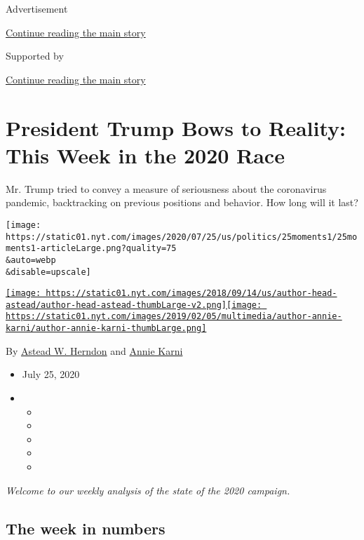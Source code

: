 Advertisement

\protect\hyperlink{after-top}{Continue reading the main story}

Supported by

\protect\hyperlink{after-sponsor}{Continue reading the main story}

\hypertarget{president-trump-bows-to-reality-this-week-in-the-2020-race}{%
\section{President Trump Bows to Reality: This Week in the 2020
Race}\label{president-trump-bows-to-reality-this-week-in-the-2020-race}}

Mr. Trump tried to convey a measure of seriousness about the coronavirus
pandemic, backtracking on previous positions and behavior. How long will
it last?

\texttt{[image: https://static01.nyt.com/images/2020/07/25/us/politics/25moments1/25moments1-articleLarge.png?quality=75\\\&auto=webp\\\&disable=upscale]}

\href{https://www.nytimes.com/by/astead-w-herndon}{\texttt{[image: https://static01.nyt.com/images/2018/09/14/us/author-head-astead/author-head-astead-thumbLarge-v2.png]}}\href{https://www.nytimes.com/by/annie-karni}{\texttt{[image: https://static01.nyt.com/images/2019/02/05/multimedia/author-annie-karni/author-annie-karni-thumbLarge.png]}}

By \href{https://www.nytimes.com/by/astead-w-herndon}{Astead W. Herndon}
and \href{https://www.nytimes.com/by/annie-karni}{Annie Karni}

\begin{itemize}
\item
  July 25, 2020
\item
  \begin{itemize}
  \item
  \item
  \item
  \item
  \item
  \end{itemize}
\end{itemize}

\emph{Welcome to our weekly analysis of the state of the 2020 campaign.}

\hypertarget{the-week-in-numbers}{%
\subsection{The week in numbers}\label{the-week-in-numbers}}

